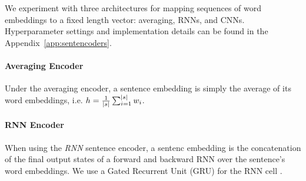 

We experiment with three architectures for mapping sequences
of word embeddings to a fixed length vector: averaging, RNNs, and CNNs.
Hyperparameter settings and implementation details can be found 
in the Appendix~\ref{app:sentencoders}.

\paragraph{Averaging Encoder} Under the averaging encoder, a sentence embedding
\sentEmb is simply the average of its word embeddings, i.e. $\sentEmb = \frac{1}{\sentSize} \sum_{i=1}^{\sentSize} \wordEmb[i]$.


%

\paragraph{RNN Encoder} When using  the \textit{RNN} sentence encoder,
a sentenc embedding is the 
concatenation 
of the
final output states of a forward and backward RNN over the sentence's word
embeddings. We use a Gated Recurrent Unit (GRU)  
for the RNN cell \cite{chung2014empirical}.

